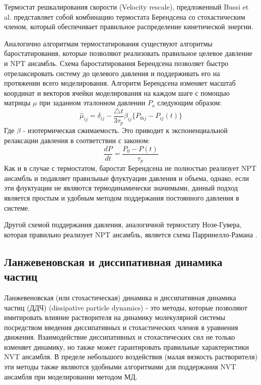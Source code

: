     Термостат решкалирования скорости (Velocity rescale), предложенный Bussi et al. \cite{bussi_canonical_2007} представляет собой комбинацию термостата Берендсена со стохастическим членом, который обеспечивает правильное распределение кинетической энергии.
    
    
    Аналогично алгоритмам термостатирования существуют алгоритмы баростатирования, которые позволяют реализовать правильное целевое давление и NPT ансамбль. Схема баростатирования Берендсена \cite{berendsen_molecular_1984} позволяет быстро отрелаксировать систему до целевого давления и поддерживать его на протяжении всего моделирования. Алгоритм Берендсена изменяет масштаб координат и векторов ячейки моделирования на каждом шаге с помощью матрицы $\mu$ при заданном эталонном давлении $P_o$ следующим образом:
\begin{equation}
    \hat{\mu}_{ij}= \delta_{ij} - \frac{\triangle t}{3 \tau_p} \beta_{ij} \big\{P_{0ij}-P_{ij}(t)\big\}
\end{equation}
Где $\beta$ - изотермическая сжимаемость.
    Это приводит к экспоненциальной релаксации давления в соответствии с законом:
\begin{equation}
    \frac{dP}{dt}=\frac{P_0 -P(t)}{\tau_p}
\end{equation}
Как и в случае с термостатом, баростат Берендсена не полностью реализует NPT ансамбль и подавляет правильные флуктуации давления и объема, однако, если эти флуктуации не являются термодинамически значимыми, данный подход является простым и удобным методом поддержания постоянного давления в системе.

    Другой схемой поддержания давления, аналогичной термостату Нозе-Гувера, которая правильно реализует NPT ансамбль, является схема  Парринелло-Рамана \cite{parrinello_polymorphic_1981}.

\subsection{Ланжевеновская и диссипативная динамика частиц}
    Ланжевеновская (или стохастическая) динамика и диссипативная динамика частиц (ДДЧ) (dissipative particle dynamics) - это методы, которые позволяют имитировать влияние растворителя на динамику молекулярной системы посредством введения диссипативных и стохастических членов в уравнения движения. Взаимодействие диссипативных и стохастических сил не только изменяет динамику, но также может гарантировать правильные характеристики NVT ансамбля. В пределе небольшого воздействия (малая вязкость растворителя) эти методы также являются удобными алгоритмами для поддержания NVT ансамбля при моделировании методом МД.
    
